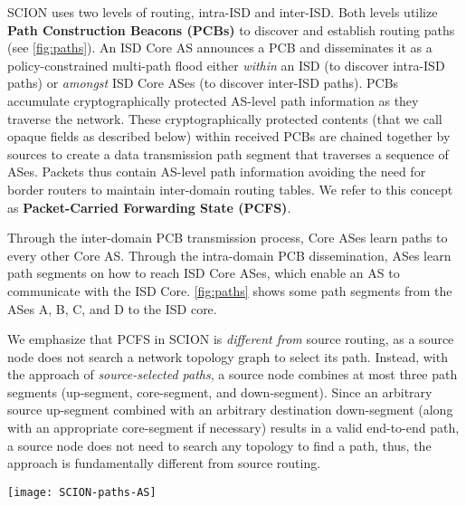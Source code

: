 \documentclass[a4paper]{llncs}
\newcommand\SCION{{\small\textsf{SCION}}\xspace}
\newcommand\A{\textsf{A}\xspace}
\newcommand\B{\textsf{B}\xspace}
\newcommand\C{\textsf{C}\xspace}
\newcommand\D{\textsf{D}\xspace}
\begin{document}
\SCION uses two levels of routing, intra-ISD and inter-ISD. Both levels utilize
\textbf{Path Construction Beacons (PCBs)} to discover and establish routing
paths (see \autoref{fig:paths}). An ISD Core AS announces a PCB and
disseminates it as a policy-constrained multi-path flood either \emph{within} an
ISD (to discover intra-ISD paths) or \emph{amongst} ISD Core ASes (to discover
inter-ISD paths). PCBs accumulate cryptographically protected AS-level path
information as they traverse the network. These cryptographically protected
contents (that we call opaque fields as described below) within received PCBs are chained together by
sources to create a data transmission path segment that traverses a sequence of
ASes. Packets thus contain AS-level path information
avoiding the need for border routers to maintain inter-domain routing tables.
We refer to this concept as \textbf{Packet-Carried Forwarding State (PCFS)}.

Through the inter-domain PCB transmission process, Core ASes learn
paths to every other Core AS. Through the intra-domain PCB
dissemination, ASes learn path segments on how to reach ISD Core ASes, which
enable an AS to communicate with the ISD Core. \autoref{fig:paths}
shows some path segments from the ASes \A, \B, \C, and \D to the ISD core.

We emphasize that PCFS in \SCION is \textit{different from} source
routing, as a source node does not search a network topology graph to
select its path. Instead, with the approach of
\textit{source-selected paths}, a source node combines at most three
path segments (up-segment, core-segment, and down-segment). Since an
arbitrary source up-segment combined with an arbitrary destination
down-segment (along with an appropriate core-segment if necessary)
results in a valid end-to-end path, a source node does not need to
search any topology to find a path, thus, the approach is
fundamentally different from source routing.

\begin{figure*}[tp]
  \centering
  \texttt{[image: SCION-paths-AS]}
  {\label{fig:paths}}
  {\label{fig:AS}}
  \caption{
    () \SCION ISD with path construction beacons
    (PCBs) that are propagated from the ISD Core down to customer
    ASes, and path segments for ASes \A, \B, \C, and \D to the ISD
    Core.
    () Magnified view of an AS with its routers and
    servers. The path from AS \C to the ISD Core traverses two
    internal routers.
  }
\end{figure*}
\end{document}
